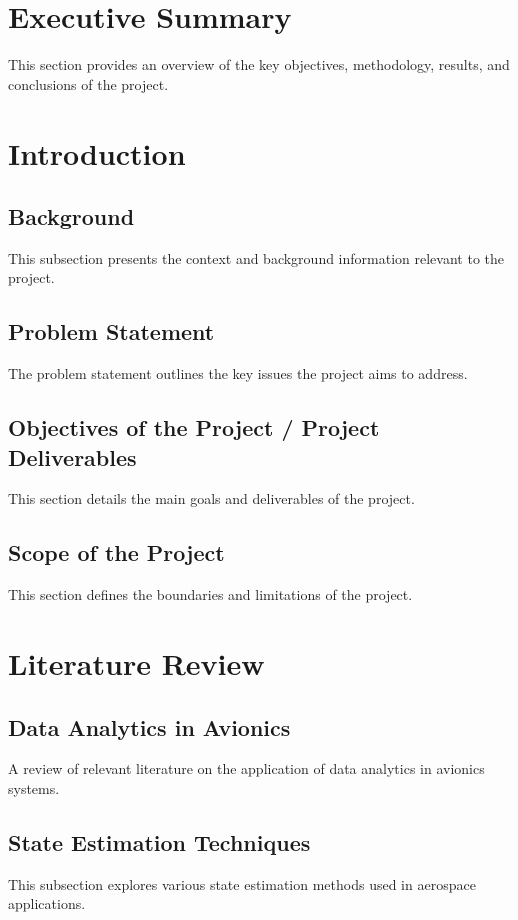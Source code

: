 \pagestyle{fancy}

\section{Executive Summary}
This section provides an overview of the key objectives, methodology, results, and conclusions of the project.

\section{Introduction}
\subsection{Background}
This subsection presents the context and background information relevant to the project.

\subsection{Problem Statement}
The problem statement outlines the key issues the project aims to address.

\subsection{Objectives of the Project / Project Deliverables}
This section details the main goals and deliverables of the project.

\subsection{Scope of the Project}
This section defines the boundaries and limitations of the project.

\section{Literature Review}
\subsection{Data Analytics in Avionics}
A review of relevant literature on the application of data analytics in avionics systems.

\subsection{State Estimation Techniques}
This subsection explores various state estimation methods used in aerospace applications.

